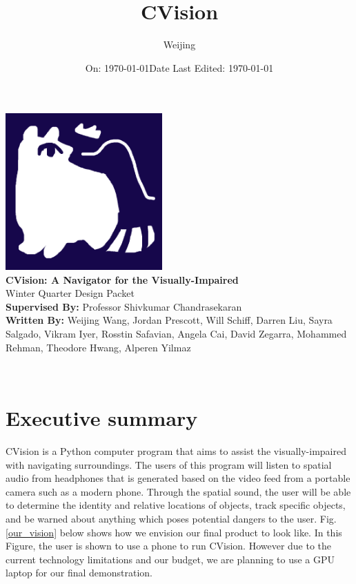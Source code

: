 \documentclass[12pt,a4paper]{article}
\title{\LARGE \textbf{CVision}}
\author{Weijing}
\date{\large On: \today}
\begin{document}
\makeatletter
\begin{titlepage}
\centering
\vspace*{1cm}
 { \includegraphics[width=6cm]{logo6.png}}\\[1cm]
 {\LARGE \textbf{CVision: A Navigator for the Visually-Impaired}}\\[0.5cm]
 {\LARGE Winter Quarter Design Packet} \\[1cm]
\textbf{Supervised By:}{ Professor Shivkumar Chandrasekaran}\\[1cm]
\textbf{Written By:}{
 Weijing Wang,
 Jordan Prescott,
 Will Schiff,
 Darren Liu,
 Sayra Salgado,
 Vikram Iyer,
 Rosstin Safavian,
 Angela Cai,
 David Zegarra,
 Mohammed Rehman,
 Theodore Hwang,
 Alperen Yilmaz
 }\\[1cm]
\date{\large Date Last Edited: \today}
 {\@date\\}
\end{titlepage}

\tableofcontents
\clearpage

\section{Executive summary}
CVision is a Python computer program that aims to assist the visually-impaired with navigating surroundings.
The users of this program will listen to spatial audio from headphones that is generated based on the video feed from a portable camera such as a modern phone.
Through the spatial sound, the user will be able to determine the identity and relative locations of objects, track specific objects, and be warned about anything which poses potential dangers to the user. 
Fig. \ref{our_vision} below shows how we envision our final product to look like.
In this Figure, the user is shown to use a phone to run CVision.
However due to the current technology limitations and our budget, we are planning to use a GPU laptop for our final demonstration.
\end{document}
